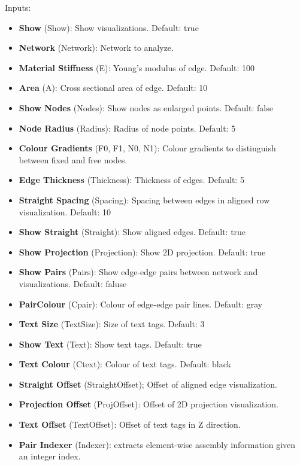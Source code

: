 Inputs:
\begin{itemize}
    \setlength\itemsep{0.05em}
    \item \textbf{Show} (Show): Show visualizations. {\color{gray} Default: true}
    \item \textbf{Network} (Network): Network to analyze.
    \item \textbf{Material Stiffness} (E): Young's modulus of edge. {\color{gray} Default: 100}
    \item \textbf{Area} (A): Cross sectional area of edge. {\color{gray} Default: 10}
    \item \textbf{Show Nodes} (Nodes): Show nodes as enlarged points. {\color{gray} Default: false}
    \item \textbf{Node Radius} (Radius): Radius of node points. {\color{gray} Default: 5}
    \item  \textbf{Colour Gradients} (F0, F1, N0, N1): Colour gradients to distinguish between fixed and free nodes.
    \item \textbf{Edge Thickness} (Thickness): Thickness of edges. {\color{gray} Default: 5}
    \item \textbf{Straight Spacing} (Spacing): Spacing between edges in aligned row visualization. {\color{gray} Default: 10}
    \item \textbf{Show Straight} (Straight): Show aligned edges. {\color{gray} Default: true}
    \item \textbf{Show Projection} (Projection): Show 2D projection. {\color{gray} Default: true}
    \item \textbf{Show Pairs} (Pairs): Show edge-edge pairs between network and visualizations. {\color{gray} Default: faluse}
    \item \textbf{PairColour} (Cpair): Colour of edge-edge pair lines. {\color{gray} Default: gray}
    \item \textbf{Text Size} (TextSize): Size of text tags. {\color{gray} Default: 3}
    \item \textbf{Show Text} (Text): Show text tags. {\color{gray} Default: true}
    \item \textbf{Text Colour} (Ctext): Colour of text tags. {\color{gray} Default: black}
    \item \textbf{Straight Offset} (StraightOffset); Offset of aligned edge visualization.
    \item \textbf{Projection Offset} (ProjOffset): Offset of 2D projection visualization.
    \item \textbf{Text Offset} (TextOffset): Offset of text tags in Z direction.
    \item \textbf{Pair Indexer} (Indexer): extracts element-wise assembly information given an integer index.
\end{itemize}